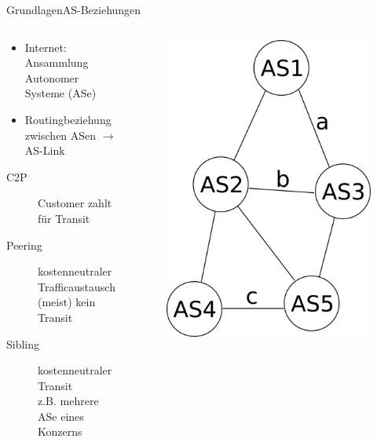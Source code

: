 \documentclass[ngerman,compress,hyperref={bookmarks}]{beamer}
\begin{document}
\begin{frame}[allowframebreaks]{Grundlagen}{AS-Beziehungen}
  \begin{columns}[c]
    \begin{column}{0.75\textwidth}
      \begin{itemize}
        \item Internet: Ansammlung Autonomer Systeme (ASe)
        \item Routingbeziehung zwischen ASen $\rightarrow$ AS-Link
      \end{itemize}
      \begin{description}
        \item[C2P] Customer zahlt für Transit
        \item[Peering] kostenneutraler Trafficaustausch\\{\scriptsize(meist) kein Transit}
        \item[Sibling] kostenneutraler Transit\\{\scriptsize z.B. mehrere ASe eines Konzerns}
      \end{description}
    \end{column}
    \begin{column}{0.25\textwidth}
      \begin{figure}
        \includegraphics[width=1\textwidth]{images/Routingbeziehungen}

\end{figure}
\end{column}
\end{columns}
\end{frame}
\end{document}
